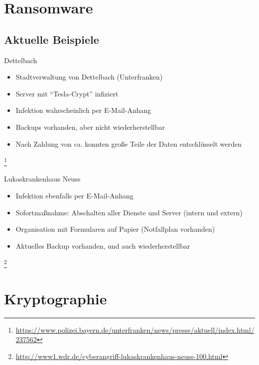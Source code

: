 \documentclass[10pt]{beamer}
\begin{document}
\section{Ransomware}
\subsection{Aktuelle Beispiele}
\begin{frame}{Dettelbach}

	\begin{itemize}
		\item Stadtverwaltung von Dettelbach (Unterfranken)
		\item Server mit "`Tesla-Crypt"' infiziert
		\item Infektion wahrscheinlich per E-Mail-Anhang
		\item Backups vorhanden\pause , aber nicht wiederherstellbar
		\item Nach Zahlung von ca.  konnten große Teile der Daten entschlüsselt werden
	\end{itemize}
	\let\thefootnote\relax\footnote{\url{https://www.polizei.bayern.de/unterfranken/news/presse/aktuell/index.html/237562}}
\end{frame}

\begin{frame}{Lukaskrankenhaus Neuss}

	\begin{itemize}
		\item Infektion ebenfalls per E-Mail-Anhang
		\item Sofortmaßnahme: Abschalten aller Dienste und Server (intern und extern) \pause
		\item Organisation mit Formularen auf Papier (Notfallplan vorhanden)
		\item Aktuelles Backup vorhanden\pause , und auch wiederherstellbar
	\end{itemize}
	\let\thefootnote\relax\footnote{\url{http://www1.wdr.de/cyberangriff-lukaskrankenhaus-neuss-100.html}}
\end{frame}

\section{Kryptographie}
\end{document}
